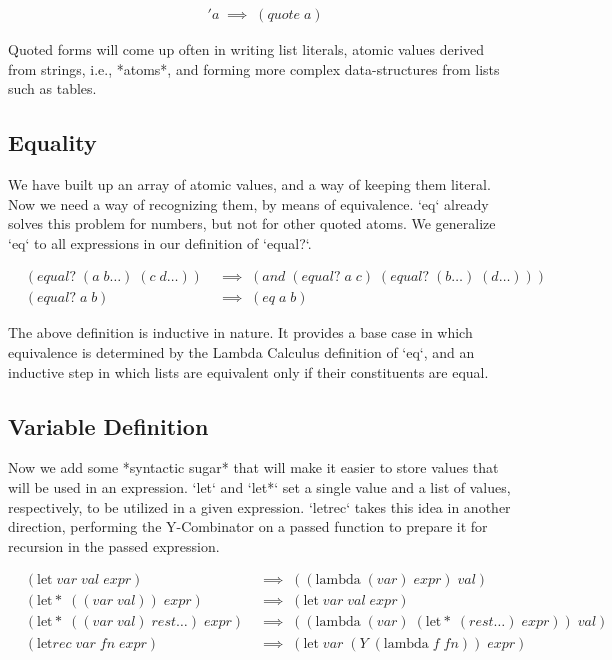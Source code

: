 \begin{align*}
& 'a \; \implies \; (quote \; a)
\end{align*}

Quoted forms will come up often in writing list literals, atomic values derived 
from strings, i.e., *atoms*, and forming more complex data-structures from lists 
such as tables.

\subsection{Equality}
We have built up an array of atomic values, and a way of keeping them literal. Now 
we need a way of recognizing them, by means of equivalence. `eq` already solves 
this problem for numbers, but not for other quoted atoms. We generalize `eq` to 
all expressions in our definition of `equal?`.

\begin{align*}
& (equal? \; (a \; b\dots) \; (c \; d\dots)) \; &\implies \; (and \; (equal? \; a \; c) \; (equal? \; (b\dots) \; (d\dots)))
\\& (equal? \; a \; b) \; &\implies \; (eq \; a \; b)
\end{align*}

The above definition is inductive in nature. It provides a base case in which 
equivalence is determined by the Lambda Calculus definition of `eq`, and an 
inductive step in which lists are equivalent only if their constituents are equal.

\subsection{Variable Definition}
Now we add some *syntactic sugar* that will make it easier to store values that 
will be used in an expression. `let` and `let*` set a single value and a list of 
values, respectively, to be utilized in a given expression. `letrec` takes this 
idea in another direction, performing the Y-Combinator on a passed function to 
prepare it for recursion in the passed expression.

\begin{align*}
& (\text{let} \; var \; val \; expr) \; &\implies \; ((\text{lambda} \; (var) \; expr) \; val)
\\& (\text{let}* \; ((var \; val)) \; expr) \; &\implies \; (\text{let} \; var \; val \; expr)
\\& (\text{let}* \; ((var \; val) \; rest\dots) \; expr) \; &\implies \; ((\text{lambda} \; (var) \; (\text{let}* \; (rest\dots) \; expr)) \; val)
\\& (\text{let}rec \; var \; fn \; expr) \; &\implies \; (\text{let} \; var \; (Y \; (\text{lambda} \; f \; fn)) \; expr)
\end{align*}

